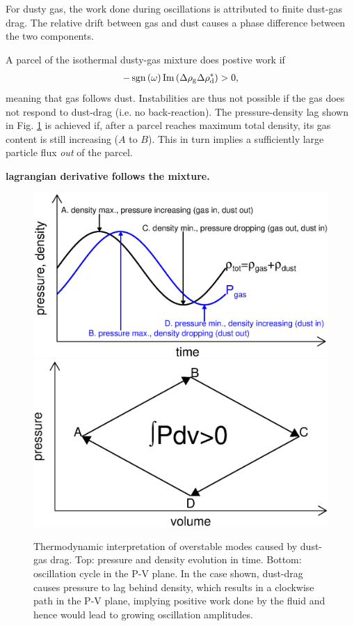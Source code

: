 For dusty gas, the work done during oscillations 
 is attributed to finite dust-gas drag. The relative
drift between gas and dust causes a phase difference between the two
components. 

A parcel of the isothermal dusty-gas mixture does 
postive work if  
\begin{align*}
-\operatorname{sgn}\left(\omega\right)\operatorname{Im}\left(\Delta\rho_\mathrm{g}\Delta\rho_\mathrm{d}^*\right)>0,
\end{align*}
meaning that gas follows dust. Instabilities are thus not possible if the
gas does not respond to dust-drag (i.e. no back-reaction). The
pressure-density lag shown in Fig. \ref{pdv_cartoon} is achieved if, 
after a parcel reaches maximum total density, its 
gas content is still increasing ($A$ to $B$). This in turn implies a sufficiently
large particle flux \emph{out} of the parcel.   

{\bf lagrangian derivative follows the mixture.}

\begin{figure}
  \includegraphics[width=\linewidth]{figures/drag}\\
\includegraphics[width=\linewidth]{figures/pdv}
  \caption{Thermodynamic interpretation of overstable modes caused by
    dust-gas drag. Top: pressure and density evolution in time. 
    Bottom: oscillation cycle in the P-V plane. In the case shown,
    dust-drag causes 
    pressure to lag behind density, which results in a clockwise path in
    the P-V plane, implying positive work done by the fluid and
    hence would lead to growing oscillation amplitudes.  
    \label{pdv_cartoon}
  }
\end{figure}

